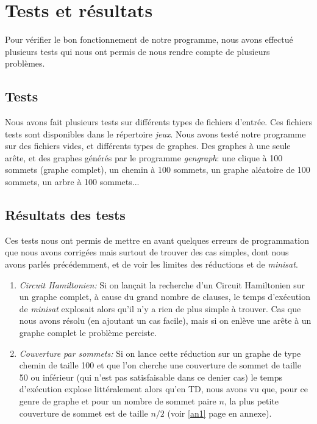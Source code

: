  \section{Tests et résultats}
  Pour vérifier le bon fonctionnement de notre programme, nous avons
  effectué plusieurs tests qui nous ont permis de nous rendre compte de
  plusieurs problèmes.

  \subsection{Tests}
  Nous avons fait plusieurs tests sur différents types de fichiers
  d'entrée. Ces fichiers tests sont disponibles dans le répertoire
  \emph{jeux}. \newline
  \indent Nous avons testé notre programme sur des fichiers vides,
  et différents types de graphes. Des graphes à une seule arête, et des
  graphes générés par le programme \emph{gengraph}: une clique à 100
  sommets (graphe complet), un chemin à 100 sommets, un graphe aléatoire
  de 100 sommets, un arbre à 100 sommets...

  \subsection{Résultats des tests}
  Ces tests nous ont permis de mettre en avant quelques erreurs de
  programmation que nous avons corrigées mais surtout de trouver des cas
  simples, dont nous avons parlés précédemment, et de voir les limites
  des réductions et de \emph{minisat}.
  \begin{enumerate}
   \item \emph{Circuit Hamiltonien:} Si on lançait la recherche d'un
	 Circuit Hamiltonien sur un graphe complet, à cause du grand
	 nombre de clauses, le temps d'exécution de \emph{minisat}
	 explosait alors qu'il n'y a rien de plus simple à trouver. Cas
	 que nous avons résolu (en ajoutant un cas facile), mais si on
	 enlève une arête à un graphe complet le problème perciste.
   \item \emph{Couverture par sommets:} Si on lance cette réduction sur
	 un graphe de type chemin de taille 100 et que l'on cherche une
	 couverture de sommet de taille 50 ou inférieur (qui n'est pas
	 satisfaisable dans ce denier cas) le temps d'exécution explose
	 littéralement alors qu'en TD, nous avons vu que, pour ce genre
	 de graphe et pour un nombre de sommet paire $n$, la plus petite
	 couverture de sommet est de taille $n/2$ (voir \ref{an1} page
	 \pageref{an1} en annexe).
  \end{enumerate}

